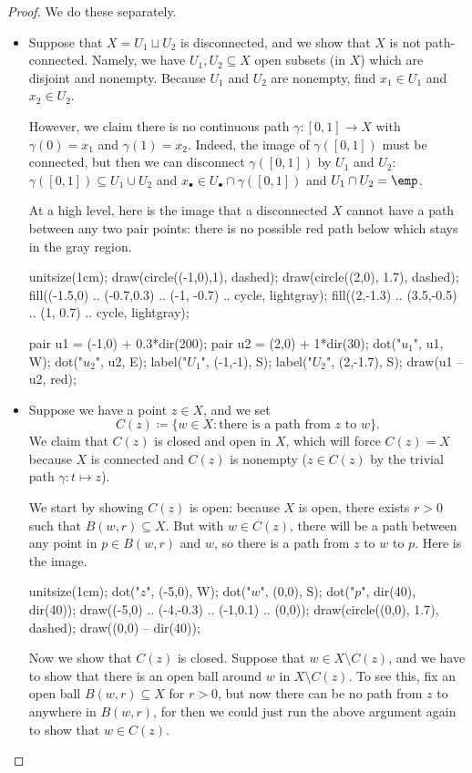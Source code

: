 \begin{proof}
	We do these separately.
	\begin{itemize}
		\item Suppose that $X=U_1\sqcup U_2$ is disconnected, and we show that $X$ is not path-connected. Namely, we have $U_1,U_2\subseteq X$ open subsets (in $X$) which are disjoint and nonempty. Because $U_1$ and $U_2$ are nonempty, find $x_1\in U_1$ and $x_2\in U_2$.

		However, we claim there is no continuous path $\gamma\colon[0,1]\to X$ with $\gamma(0)=x_1$ and $\gamma(1)=x_2$. Indeed, the image of $\gamma([0,1])$ must be connected, but then we can disconnect $\gamma([0,1])$ by $U_1$ and $U_2$: $\gamma([0,1])\subseteq U_1\cup U_2$ and $x_\bullet\in U_\bullet\cap\gamma([0,1])$ and $U_1\cap U_2=\emp$.

		At a high level, here is the image that a disconnected $X$ cannot have a path between any two pair points: there is no possible red path below which stays in the gray region.
		\begin{center}
			\begin{asy}
				unitsize(1cm);
				draw(circle((-1,0),1), dashed);
				draw(circle((2,0), 1.7), dashed);
				fill((-1.5,0) .. (-0.7,0.3) .. (-1, -0.7) .. cycle, lightgray);
				fill((2,-1.3) .. (3.5,-0.5) .. (1, 0.7) .. cycle, lightgray);

				pair u1 = (-1,0) + 0.3*dir(200);
				pair u2 = (2,0) + 1*dir(30);
				dot("$u_1$", u1, W);
				dot("$u_2$", u2, E);
				label("$U_1$", (-1,-1), S);
				label("$U_2$", (2,-1.7), S);
				draw(u1 -- u2, red);
			\end{asy}
		\end{center}

		\item Suppose we have a point $z\in X$, and we set
		\[C(z)\coloneqq \{w\in X:\text{there is a path from }z\text{ to }w\}.\]
		We claim that $C(z)$ is closed and open in $X$, which will force $C(z)=X$ because $X$ is connected and $C(z)$ is nonempty ($z\in C(z)$ by the trivial path $\gamma\colon t\mapsto z$).

		We start by showing $C(z)$ is open: because $X$ is open, there exists $r>0$ such that $B(w,r)\subseteq X$. But with $w\in C(z)$, there will be a path between any point in $p\in B(w,r)$ and $w$, so there is a path from $z$ to $w$ to $p$. Here is the image.
		\begin{center}
			\begin{asy}
				unitsize(1cm);
				dot("$z$", (-5,0), W);
				dot("$w$", (0,0), S);
				dot("$p$", dir(40), dir(40));
				draw((-5,0) .. (-4,-0.3) .. (-1,0.1) .. (0,0));
				draw(circle((0,0), 1.7), dashed);
				draw((0,0) -- dir(40));
			\end{asy}
		\end{center}

		Now we show that $C(z)$ is closed. Suppose that $w\in X\setminus C(z)$, and we have to show that there is an open ball around $w$ in $X\setminus C(z)$. To see this, fix an open ball $B(w,r)\subseteq X$ for $r>0$, but now there can be no path from $z$ to anywhere in $B(w,r)$, for then we could just run the above argument again to show that $w\in C(z)$.
		\qedhere
	\end{itemize}
\end{proof}
